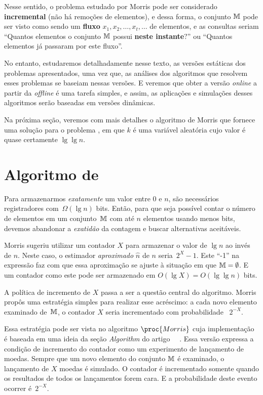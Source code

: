 Nesse sentido, o problema estudado por Morris pode ser considerado \textbf{incremental} (não há remoções de elementos), 
e dessa forma, o conjunto $\mathbb{M}$ pode ser visto como sendo um \textbf{fluxo} $x_1, x_2, \dots, x_t, \dots$ de elementos, 
e as consultas seriam ``Quantos elementos o conjunto $\mathbb{M}$ possui \textbf{neste instante}$?$'' ou 
``Quantos elementos já passaram por este fluxo''.

No entanto, estudaremos detalhadamente nesse texto, as versões estáticas dos problemas apresentados, uma vez que, as 
análises dos algoritmos que resolvem esses problemas se baseiam nessas versões. E veremos que obter a versão 
\textit{online} a partir da \textit{offline} é uma tarefa simples, e assim, as aplicações e simulações desses algoritmos 
serão baseadas em versões dinâmicas.

Na próxima seção, veremos com mais detalhes o algoritmo de Morris que fornece uma solução para o problema 
, em que $k$ é uma variável aleatória cujo valor é quase certamente $\lg \lg n$.

\section{Algoritmo de }
\label{chap:morris:algorithm}

Para armazenarmos \textit{exatamente} um valor entre $0$ e $n$, são necessários registradores com~$\Omega(\lg n)$ bits. 
Então, para que seja possível contar o número de elementos em um conjunto~$\mathbb{M}$ com até $n$ elementos usando menos 
bits, devemos abandonar a \textit{exatidão} da contagem e buscar alternativas aceitáveis.

Morris sugeriu utilizar um contador $X$ para armazenar o valor de $\lg n$ ao invés de $n$. Neste caso, o estimador 
\textit{aproximado} $\hat{n}$ de $n$ seria~$2^{X} - 1$. Este ``-1'' na expressão faz com que essa aproximação se ajuste 
à situação em que $\mathbb{M} = \emptyset$. E um contador como este pode ser armazenado em $O(\lg X) = O(\lg \lg n)$ bits.

A política de incremento de $X$ passa a ser a questão central do algoritmo. Morris propôs uma estratégia simples para 
realizar esse acréscimo: a cada novo elemento examinado de~$\mathbb{M}$, o contador $X$ seria incrementado com probabilidade~ 
$2^{-X}$.

Essa estratégia pode ser vista no algoritmo $\proc{Morris}$ cuja implementação é baseada em uma ideia da seção 
\textit{Algorithm} do artigo ~~\citep{ApproximateCountingAlgorithm}. Essa 
versão expressa a condição de incremento do contador como um experimento de lançamento de moedas. Sempre que um novo 
elemento do conjunto $\mathbb{M}$ é examinado, o lançamento de $X$ moedas é simulado. O contador é incrementado somente quando 
os resultados de todos os lançamentos forem cara. E a probabilidade deste evento ocorrer é~$2^{-X}$.

